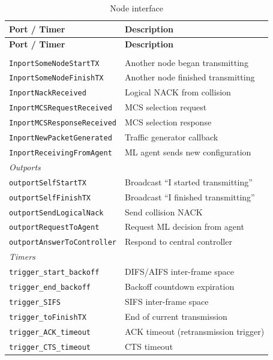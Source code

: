 \documentclass[11pt,a4paper]{article}
\begin{document}
\begin{longtable}{l p{9.5cm}}
\caption{Node interface}\label{tab:node-iface}\\
\toprule
\textbf{Port / Timer} & \textbf{Description} \\
\midrule
\endfirsthead
\toprule
\textbf{Port / Timer} & \textbf{Description} \\
\midrule
\endhead
\bottomrule
\endlastfoot
\multicolumn{2}{l}{\textit{Inports}} \\
\texttt{InportSomeNodeStartTX}      & Another node began transmitting \\
\texttt{InportSomeNodeFinishTX}     & Another node finished transmitting \\
\texttt{InportNackReceived}         & Logical NACK from collision \\
\texttt{InportMCSRequestReceived}   & MCS selection request \\
\texttt{InportMCSResponseReceived}  & MCS selection response \\
\texttt{InportNewPacketGenerated}   & Traffic generator callback \\
\texttt{InportReceivingFromAgent}   & ML agent sends new configuration \\
\midrule
\multicolumn{2}{l}{\textit{Outports}} \\
\texttt{outportSelfStartTX}        & Broadcast ``I started transmitting'' \\
\texttt{outportSelfFinishTX}       & Broadcast ``I finished transmitting'' \\
\texttt{outportSendLogicalNack}    & Send collision NACK \\
\texttt{outportRequestToAgent}     & Request ML decision from agent \\
\texttt{outportAnswerToController}  & Respond to central controller \\
\midrule
\multicolumn{2}{l}{\textit{Timers}} \\
\texttt{trigger\_start\_backoff}   & DIFS/AIFS inter-frame space \\
\texttt{trigger\_end\_backoff}     & Backoff countdown expiration \\
\texttt{trigger\_SIFS}             & SIFS inter-frame space \\
\texttt{trigger\_toFinishTX}       & End of current transmission \\
\texttt{trigger\_ACK\_timeout}     & ACK timeout (retransmission trigger) \\
\texttt{trigger\_CTS\_timeout}     & CTS timeout \\

\end{longtable}
\end{document}
